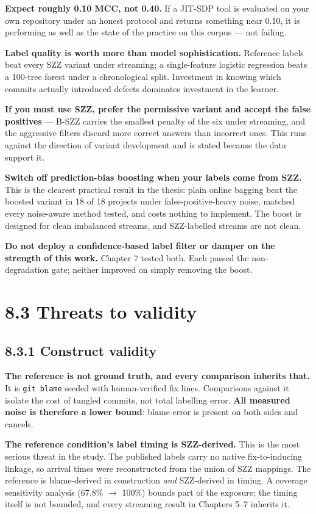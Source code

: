 \textbf{Expect roughly 0.10 MCC, not 0.40.} If a JIT-SDP tool is
evaluated on your own repository under an honest protocol and returns
something near 0.10, it is performing as well as the state of the
practice on this corpus --- not failing.

\textbf{Label quality is worth more than model sophistication.}
Reference labels beat every SZZ variant under streaming; a
single-feature logistic regression beats a 100-tree forest under a
chronological split. Investment in knowing which commits actually
introduced defects dominates investment in the learner.

\textbf{If you must use SZZ, prefer the permissive variant and accept
the false positives} --- B-SZZ carries the smallest penalty of the six
under streaming, and the aggressive filters discard more correct answers
than incorrect ones. This runs against the direction of variant
development and is stated because the data support it.

\textbf{Switch off prediction-bias boosting when your labels come from
SZZ.} This is the clearest practical result in the thesis: plain online
bagging beat the boosted variant in 18 of 18 projects under
false-positive-heavy noise, matched every noise-aware method tested, and
costs nothing to implement. The boost is designed for clean imbalanced
streams, and SZZ-labelled streams are not clean.

\textbf{Do not deploy a confidence-based label filter or damper on the
strength of this work.} Chapter 7 tested both. Each passed the
non-degradation gate; neither improved on simply removing the boost.

\section{8.3 Threats to validity}\label{threats-to-validity}

\subsection{8.3.1 Construct validity}\label{construct-validity}

\textbf{The reference is not ground truth, and every comparison inherits
that.} It is \texttt{git\ blame} seeded with human-verified fix lines.
Comparisons against it isolate the cost of tangled commits, not total
labelling error. \textbf{All measured noise is therefore a lower bound}:
blame error is present on both sides and cancels.

\textbf{The reference condition's label timing is SZZ-derived.} This is
the most serious threat in the study. The published labels carry no
native fix-to-inducing linkage, so arrival times were reconstructed from
the union of SZZ mappings. The reference is blame-derived in
construction \emph{and} SZZ-derived in timing. A coverage sensitivity
analysis (67.8\% \ensuremath{\rightarrow} 100\%) bounds part of the exposure; the timing itself
is not bounded, and every streaming result in Chapters 5--7 inherits it.

